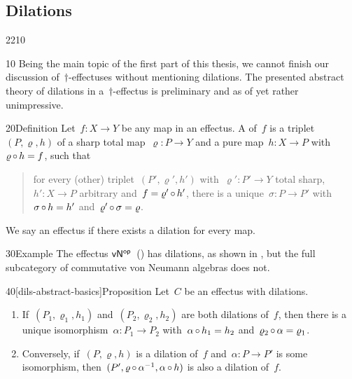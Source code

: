 \subsection{Dilations}
\begin{parsec}{2210}%
\begin{point}{10}%
Being the main topic of the first part of this thesis,
    we cannot finish our discussion of~$\dagger$-effectuses
    without mentioning dilations.
The presented abstract theory of dilations in a~$\dagger$-effectus
    is preliminary and as of yet rather unimpressive.
\end{point}
\begin{point}{20}{Definition}%
Let~$f\colon X \to Y$ be any map in an effectus.
    A  of~$f$ 
    is a triplet~$(P, \varrho, h)$
    of a sharp total map~$\varrho \colon P \to Y$
    and a pure map~$h \colon X \to P$
    with~$\varrho \mathop{\circ} h = f$,
    such that
\begin{quote}
    for every (other) triplet~$(P', \varrho', h')$
    with~$\varrho'\colon P' \to Y$ total sharp,
    $h'\colon X \to P$ arbitrary and~$f = \varrho'\mathop{\circ} h'$,
    there is a unique~$\sigma \colon P \to P'$
    with~$\sigma \mathop{\circ} h = h'$
    and~$\varrho' \mathop{\circ} \sigma = \varrho$.
\end{quote}
    We say an effectus  if 
    there exists a dilation for every map.
\end{point}
\begin{point}{30}{Example}%
    The effectus ${\mathsf{vN}}{^{\mathsf{op}}}$~() has dilations,
    as shown in ,
    but the full subcategory of commutative von Neumann algebras
    does not.
\end{point}
\begin{point}{40}[dils-abstract-basics]{Proposition}%
Let~$C$ be an effectus with dilations.
\begin{enumerate}
\item
    If~$(P_1,\varrho_1,h_1)$
    and~$(P_2,\varrho_2,h_2)$
        are both dilations of~$f$,
    then there is a unique isomorphism~$\alpha\colon P_1 \to P_2$
        with~$\alpha \mathop{\circ} h_1 = h_2$ and~$\varrho_2 \mathop{\circ} \alpha = \varrho_1$.
\item
    Conversely,
    if~$(P,\varrho,h)$
        is a dilation of~$f$ and~$\alpha\colon P \to P'$ is some isomorphism,
        then~$(P', \varrho \mathop{\circ} \alpha^{-1}, \alpha \mathop{\circ} h)$
        is also a dilation of~$f$.


\end{enumerate}
\end{point}
\end{parsec}
